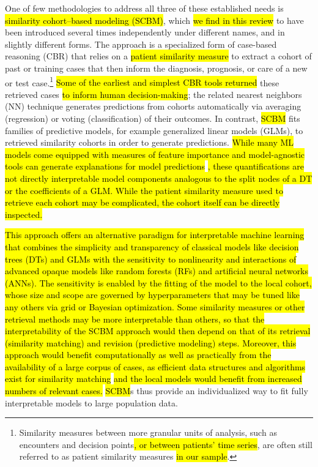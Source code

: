 \documentclass[sn-mathphys,Numbered,pdflatex]{sn-jnl}
\theoremstyle{remark}
\theoremstyle{definition}
\begin{document}
One of few methodologies to address all three of these established needs
is \hl{similarity cohort--based modeling (SCBM)}, which
\hl{we find in this review} to have been introduced several times
independently under different names, and in slightly different forms.
The approach is a specialized form of case-based reasoning (CBR) that
relies on a \hl{patient similarity measure }\citep{Brown2016} to extract
a cohort of past or training cases that then inform the diagnosis,
prognosis, or care of a new or test case.\footnote{Similarity measures
  between more granular units of analysis, such as encounters and
  decision points\hl{, or between patients' time series}, are often
  still referred to as patient similarity measures\hl{ in our sample}.}
\hl{Some of the earliest and simplest CBR tools returned} these
retrieved cases \hl{ to inform human decision-making}\citep{Aamodt1994};
the related nearest neighbors (NN) technique generates predictions from
cohorts automatically via averaging (regression) or voting
(classification) of their outcomes. In contrast, \hl{SCBM} fits families
of predictive models, for example generalized linear models (GLMs), to
retrieved similarity cohorts in order to generate predictions.
\hl{While many ML models come equipped with measures of feature importance and model-agnostic tools can generate explanations for model predictions }\citep{Molnar2023}\hl{, these quantifications are not directly interpretable model components analogous to the split nodes of a DT or the coefficients of a GLM.
While the patient similarity measure used to retrieve each cohort may be complicated, the cohort itself can be directly inspected.}

\hl{This approach offers an alternative paradigm for interpretable machine learning that combines the simplicity and transparency of classical models like decision trees (DTs) and GLMs with the sensitivity to nonlinearity and interactions of advanced opaque models like random forests (RFs) and artificial neural networks (ANNs). The sensitivity is enabled by the fitting of the model to the local cohort, whose size and scope are governed by hyperparameters that may be tuned like any others via grid or Bayesian optimization. Some similarity measures or other retrieval methods may be more interpretable than others, so that the interpretability of the SCBM approach would then depend on that of its retrieval (similarity matching) and revision (predictive modeling) steps. Moreover, this approach would benefit computationally as well as practically from the availability of a large corpus of cases, as efficient data structures and algorithms exist for similarity matching }\citep{Halder2024}\hl{ and the local models would benefit from increased numbers of relevant cases.}
\hl{SCBM}s thus provide an individualized way to fit fully interpretable
models to large population data.
\end{document}
